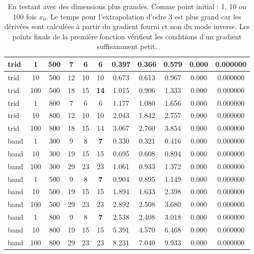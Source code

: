 \begin{table}
\begin{center}
{\begin{tabular}{|l|c|c|c|c|c|c|c|c|c|c|}
trid & 1 & 500 & 7 & 6 & 6 & 0.397 & 0.366 & 0.579 & 0.000 & 0.000000 \\\hline 
trid & 10 & 500 & 12 & 10 & 10 & 0.673 & 0.613 & 0.967 & 0.000 & 0.000000 \\\hline 
trid & 100 & 500 & 18 & 15 &{\bf 14} & 1.015 & 0.906 & 1.333 & 0.000 & 0.000000 \\\hline 
trid & 1 & 800 & 7 & 6 & 6 & 1.177 & 1.080 & 1.656 & 0.000 & 0.000000 \\\hline 
trid & 10 & 800 & 12 & 10 & 10 & 2.043 & 1.842 & 2.757 & 0.000 & 0.000000 \\\hline 
trid & 100 & 800 & 18 & 15 & 14 & 3.067 & 2.760 & 3.854 & 0.000 & 0.000000 \\\hline 
band & 1 & 300 & 9 & 8 &{\bf 7} & 0.330 & 0.321 & 0.416 & 0.000 & 0.000000 \\\hline 
band & 10 & 300 & 19 & 15 & 15 & 0.695 & 0.608 & 0.894 & 0.000 & 0.000000 \\\hline 
band & 100 & 300 & 29 & 23 & 23 & 1.061 & 0.933 & 1.372 & 0.000 & 0.000000 \\\hline 
band & 1 & 500 & 9 & 8 &{\bf 7} & 0.904 & 0.895 & 1.149 & 0.000 & 0.000000 \\\hline 
band & 10 & 500 & 19 & 15 & 15 & 1.894 & 1.633 & 2.398 & 0.000 & 0.000000 \\\hline 
band & 100 & 500 & 29 & 23 & 23 & 2.892 & 2.508 & 3.680 & 0.000 & 0.000000 \\\hline 
band & 1 & 800 & 9 & 8 &{\bf 7} & 2.538 & 2.408 & 3.018 & 0.000 & 0.000000 \\\hline 
band & 10 & 800 & 19 & 15 & 15 & 5.391 & 4.570 & 6.468 & 0.000 & 0.000000 \\\hline 
band & 100 & 800 & 29 & 23 & 23 & 8.231 & 7.040 & 9.933 & 0.000 & 0.000000 \\\hline 
\end{tabular}
}
	\end{center}
	\caption{En testant avec des dimensions plus grandes. Comme point initial : 1, 10 ou 100 fois $x_0$. Le temps pour 
l'extrapolation d'odre 3 est plus grand car les d\'eriv\'ees sont calcul\'ees \`a partir du gradient fourni et non du mode inverse.
Les points finals de la premi\`ere fonction v\'erifient les conditions d'un gradient suffisamment petit.}
\label{tab:dimplus}


\end{table}

